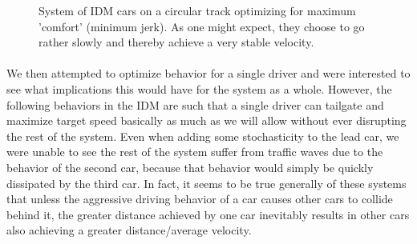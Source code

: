 \documentclass[12pt]{article}
\begin{document}
\begin{figure}[H]
  \centering
  \caption{System of IDM cars on a circular track optimizing for maximum 'comfort' (minimum jerk). As one might expect, they choose to go rather slowly and thereby achieve a very stable velocity.}
\end{figure}

\paragraph{}We then attempted to optimize behavior for a single driver and were interested to see what implications this would have for the system as a whole. However, the following behaviors in the IDM are such that a single driver can tailgate and maximize target speed basically as much as we will allow without ever disrupting the rest of the system. Even when adding some stochasticity to the lead car, we were unable to see the rest of the system suffer from traffic waves due to the behavior of the second car, because that behavior would simply be quickly dissipated by the third car. In fact, it seems to be true generally of these systems that unless the aggressive driving behavior of a car causes other cars to collide behind it, the greater distance achieved by one car inevitably results in other cars also achieving a greater distance/average velocity. \\
\end{document}
